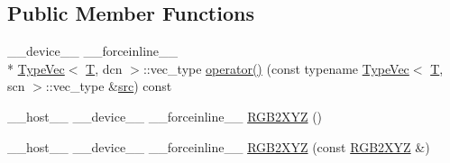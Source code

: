 \subsection*{Public Member Functions}
\begin{DoxyCompactItemize}
\item 
\-\_\-\-\_\-device\-\_\-\-\_\- \-\_\-\-\_\-forceinline\-\_\-\-\_\- \\*
\hyperlink{structcv_1_1gpu_1_1device_1_1TypeVec}{Type\-Vec}$<$ \hyperlink{calib3d_8hpp_a3efb9551a871ddd0463079a808916717}{T}, dcn $>$\-::vec\-\_\-type \hyperlink{structcv_1_1gpu_1_1device_1_1color__detail_1_1RGB2XYZ_a48cae3965a169587f3a38e9b2df18e99}{operator()} (const typename \hyperlink{structcv_1_1gpu_1_1device_1_1TypeVec}{Type\-Vec}$<$ \hyperlink{calib3d_8hpp_a3efb9551a871ddd0463079a808916717}{T}, scn $>$\-::vec\-\_\-type \&\hyperlink{legacy_8hpp_a371cd109b74033bc4366f584edd3dacc}{src}) const 
\item 
\-\_\-\-\_\-host\-\_\-\-\_\- \-\_\-\-\_\-device\-\_\-\-\_\- \-\_\-\-\_\-forceinline\-\_\-\-\_\- \hyperlink{structcv_1_1gpu_1_1device_1_1color__detail_1_1RGB2XYZ_ab6b1c63b2af6138bf78e04b15c58f5e1}{R\-G\-B2\-X\-Y\-Z} ()
\item 
\-\_\-\-\_\-host\-\_\-\-\_\- \-\_\-\-\_\-device\-\_\-\-\_\- \-\_\-\-\_\-forceinline\-\_\-\-\_\- \hyperlink{structcv_1_1gpu_1_1device_1_1color__detail_1_1RGB2XYZ_a566332883d47d0167c0f11c0e0dbef81}{R\-G\-B2\-X\-Y\-Z} (const \hyperlink{structcv_1_1gpu_1_1device_1_1color__detail_1_1RGB2XYZ}{R\-G\-B2\-X\-Y\-Z} \&)
\end{DoxyCompactItemize}



